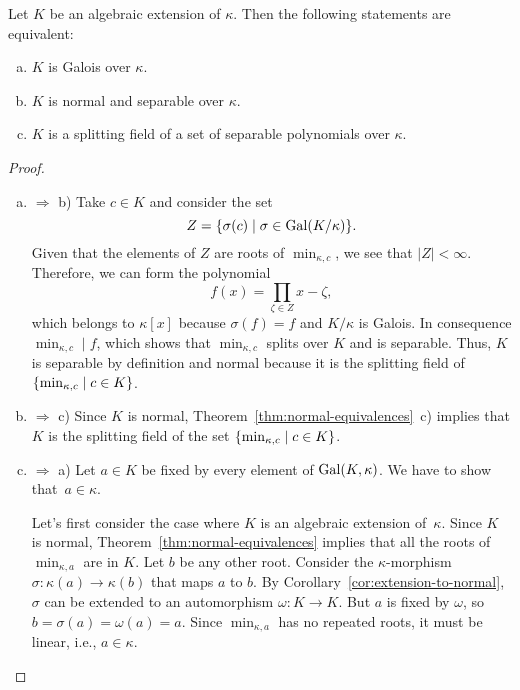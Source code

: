 \begin{thm}\label{thm:galois-equivalences}
    Let\/ $K$ be an algebraic extension of\/ $\kappa$. Then the following statements are equivalent:
    \begin{enumerate}[a), font=\upshape]
        \item $K$ is Galois over\/ $\kappa$.
        \item $K$ is normal and separable over\/ $\kappa$.
        \item $K$ is a splitting field of a set of separable polynomials over\/ $\kappa$.
    \end{enumerate}
\end{thm}

\begin{proof}${}$
    \begin{enumerate}[a), font=\upshape]
        \item $\Rightarrow$ b) Take $c\in K$ and consider the set
        $$
            Z = \{\sigma(c)\mid \sigma\in\operatorname{Gal}(K/\kappa)\}.
        $$
        Given that the elements of $Z$ are roots of $\min_{\kappa,c}$, we see that $|Z|<\infty$. Therefore, we can form the polynomial
        $$
            f(x) = \prod_{\zeta\in Z}x-\zeta,
        $$
        which belongs to $\kappa[x]$ because $\sigma(f)=f$ and $K/\kappa$ is Galois. In consequence $\min_{\kappa,c}\mid f$, which shows that $\min_{\kappa,c}$ splits over $K$ and is separable. Thus, $K$ is separable by definition and normal because it is the splitting field of $\{\min_{\kappa,c}\mid c\in K\}$.

        \item $\Rightarrow$ c) Since $K$ is normal, Theorem~\ref{thm:normal-equivalences}~c) implies that $K$ is the splitting field of the set $\{\min_{\kappa,c}\mid c\in K\}$.

        \item $\Rightarrow$ a) Let $a\in K$ be fixed by every element of $\operatorname{Gal}(K,\kappa)$. We have to show that~$a\in\kappa$.
        
        Let's first consider the case where $K$ is an algebraic extension of~$\kappa$. Since $K$ is normal, Theorem~\ref{thm:normal-equivalences} implies that all the roots of $\min_{\kappa,a}$ are in $K$. Let $b$ be any other root. Consider the $\kappa$-morphism $\sigma\colon\kappa(a)\to\kappa(b)$ that maps $a$ to $b$. By Corollary~\ref{cor:extension-to-normal}, $\sigma$ can be extended to an automorphism $\omega\colon K\to K$. But $a$ is fixed by $\omega$, so $b=\sigma(a)=\omega(a)=a$. Since $\min_{\kappa,a}$ has no repeated roots, it must be linear, i.e., $a\in\kappa$.


\end{enumerate}
\end{proof}
